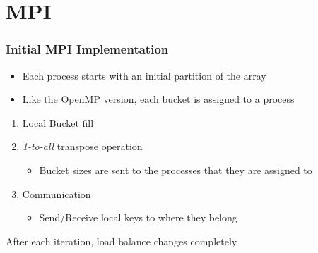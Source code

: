 \section{MPI}

\begin{frame}
	\frametitle{Initial MPI Implementation}

	\begin{itemize}
		\item[] Each process starts with an initial partition of the array

		\item[] Like the OpenMP version, each bucket is assigned to a process
	\end{itemize}


	\begin{enumerate}\itemsep=15pt
		\item Local Bucket fill

		\item \emph{1-to-all} transpose operation
		\begin{itemize}
			\item Bucket sizes are sent to the processes that they are assigned to
		\end{itemize}

		\item Communication
		\begin{itemize}
			\item Send/Receive local keys to where they belong
		\end{itemize}

	\end{enumerate}

	After each iteration, load balance changes completely
\end{frame}
